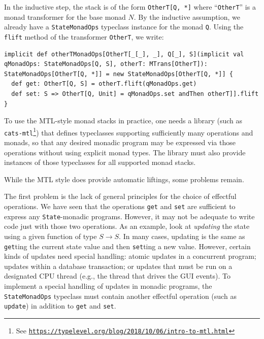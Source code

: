 In the inductive step, the stack is of the form \lstinline!OtherT[Q, *]!
where \textsf{``}\lstinline!OtherT!\textsf{''} is a monad transformer for the base
monad $N$. By the inductive assumption, we already have a \lstinline!StateMonadOps!
typeclass instance for the monad \lstinline!Q!. Using the \lstinline!flift!
method of the transformer \lstinline!OtherT!, we write:
\begin{lstlisting}
implicit def otherTMonadOps[OtherT[_[_], _], Q[_], S](implicit val qMonadOps: StateMonadOps[Q, S], otherT: MTrans[OtherT]): StateMonadOps[OtherT[Q, *]] = new StateMonadOps[OtherT[Q, *]] {
  def get: OtherT[Q, S] = otherT.flift(qMonadOps.get)
  def set: S => OtherT[Q, Unit] = qMonadOps.set andThen otherT]].flift
}
\end{lstlisting}

To use the MTL-style monad stacks in practice, one needs a library
(such as \texttt{cats-mtl}\footnote{See \texttt{\href{https://typelevel.org/blog/2018/10/06/intro-to-mtl.html}{https://typelevel.org/blog/2018/10/06/intro-to-mtl.html}}})
that defines typeclasses supporting sufficiently many operations and
monads, so that any desired monadic program may be expressed via those
operations without using explicit monad types. The library must also
provide instances of those typeclasses for all supported monad stacks. 

While the MTL style does provide automatic liftings, some problems
remain. 

The first problem is the lack of general principles for the choice
of effectful operations. We have seen that the operations \lstinline!get!
and \lstinline!set! are sufficient to express any \lstinline!State!-monadic
programs. However, it may not be adequate to write code just with
those two operations. As an example, look at \emph{updating} the state
using a given function of type $S\rightarrow S$. In many cases, updating
is the same as \lstinline!get!ting the current state value and then
\lstinline!set!ting a new value. However, certain kinds of updates
need special handling: atomic updates in a concurrent program; updates
within a database transaction; or updates that must be run on a designated
CPU thread (e.g., the thread that drives the GUI events). To implement
a special handling of updates in monadic programs, the \lstinline!StateMonadOps!
typeclass must contain another effectful operation (such as \lstinline!update!)
in addition to \lstinline!get! and \lstinline!set!.

